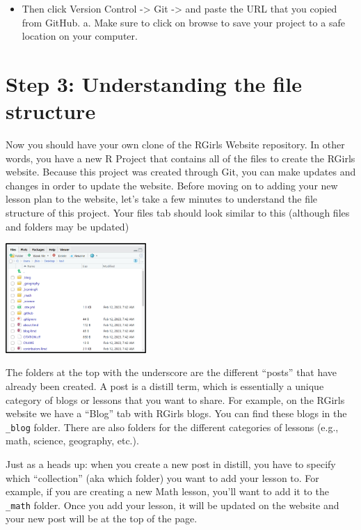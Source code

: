 \documentclass[
]{article}
\providecommand{\tightlist}{%
  \setlength{\itemsep}{0pt}\setlength{\parskip}{0pt}}
\begin{document}
\begin{itemize}
\tightlist
\item
  Then click Version Control -\textgreater{} Git -\textgreater{} and
  paste the URL that you copied from GitHub. a. Make sure to click on
  browse to save your project to a safe location on your computer.
\end{itemize}

\hypertarget{step-3-understanding-the-file-structure}{%
\section{Step 3: Understanding the file
structure}\label{step-3-understanding-the-file-structure}}

Now you should have your own clone of the RGirls Website repository. In
other words, you have a new R Project that contains all of the files to
create the RGirls website. Because this project was created through Git,
you can make updates and changes in order to update the website. Before
moving on to adding your new lesson plan to the website, let's take a
few minutes to understand the file structure of this project. Your files
tab should look similar to this (although files and folders may be
updated)

\includegraphics[width=0.4\textwidth,height=\textheight]{images/guide-img-file-structure.png}

The folders at the top with the underscore are the different ``posts''
that have already been created. A post is a distill term, which is
essentially a unique category of blogs or lessons that you want to
share. For example, on the RGirls website we have a ``Blog'' tab with
RGirls blogs. You can find these blogs in the \texttt{\_blog} folder.
There are also folders for the different categories of lessons (e.g.,
math, science, geography, etc.).

Just as a heads up: when you create a new post in distill, you have to
specify which ``collection'' (aka which folder) you want to add your
lesson to. For example, if you are creating a new Math lesson, you'll
want to add it to the \texttt{\_math} folder. Once you add your lesson,
it will be updated on the website and your new post will be at the top
of the page.
\end{document}

